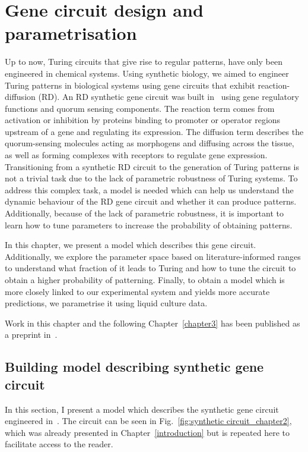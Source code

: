 \chapter{Gene circuit design and parametrisation} \label{chapter2}
Up to now, Turing circuits that give rise to regular patterns, have only been engineered in chemical systems.
Using synthetic biology, we aimed to engineer Turing patterns in biological systems using gene circuits that exhibit reaction-diffusion (RD).
An RD synthetic gene circuit was built in~\cite{Tica2020}
using gene regulatory functions and quorum sensing components.
The reaction term comes from activation or inhibition by proteins binding to promoter or operator regions upstream of a gene
and regulating its expression.
The diffusion term describes the quorum-sensing molecules acting as morphogens and diffusing across the tissue,
as well as forming complexes with receptors to regulate gene expression.
Transitioning from a synthetic RD circuit to the generation of Turing patterns is not a trivial task due to the lack of parametric robustness of Turing systems.
To address this complex task, a model is needed which can help us understand the dynamic behaviour of the RD gene circuit and whether it can produce patterns.
Additionally, because of the lack of parametric robustness, it is important to learn how to tune parameters to increase the probability of obtaining patterns.

In this chapter, we present a model which describes this gene circuit.
Additionally, we explore the parameter space based on literature-informed ranges to understand what fraction of it leads to Turing and how to tune the circuit to obtain a higher probability of patterning.
Finally, to obtain a model which is more closely linked to our experimental system and yields more accurate predictions,
we parametrise it using liquid culture data.

Work in this chapter and the following Chapter~\ref{chapter3} has been published as a preprint in~\cite{Tica2023}.
\section{Building model describing synthetic gene circuit}
In this section, I present a model which describes the synthetic gene circuit engineered in~\cite{Tica2020}.
The circuit can be seen in Fig.~\ref{fig:synthetic circuit_chapter2}, which was already presented in Chapter~\ref{introduction} but is repeated here to facilitate access to the reader.

